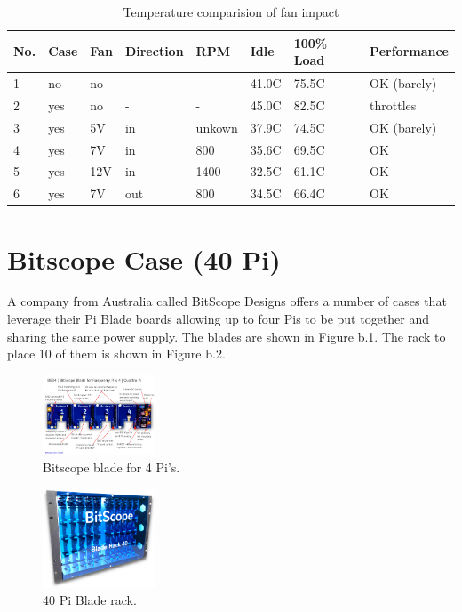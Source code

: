 \begin{table}[htb]
\caption{Temperature comparision of fan impact}\label{F:pi-fan}
\bigskip
\begin{center}
\begin{tabular}{llllllll}
\hline
No. & Case & Fan & Direction & RPM & Idle & 100\% Load &
Performance\tabularnewline
\hline
1 & no & no & - & - & 41.0C & 75.5C & OK (barely)\tabularnewline
2 & yes & no & - & - & 45.0C & 82.5C & throttles\tabularnewline
3 & yes & 5V & in & unkown & 37.9C & 74.5C & OK (barely)\tabularnewline
4 & yes & 7V & in & 800 & 35.6C & 69.5C & OK\tabularnewline
5 & yes & 12V & in & 1400 & 32.5C & 61.1C & OK\tabularnewline
6 & yes & 7V & out & 800 & 34.5C & 66.4C & OK\tabularnewline
\hline
\end{tabular}
\end{center}
\end{table}




\section{Bitscope Case (40 Pi)}\label{bitscope-case-40-pi}

A company from Australia called BitScope Designs offers a number of
cases that leverage their Pi Blade boards allowing up to four Pis to be
put together and sharing the same power supply. The blades are shown in
Figure b.1. The rack to place 10 of them is shown in Figure b.2.

\begin{figure}
\centering
\includegraphics[width=0.3\textwidth]{images/04.jpg}
\caption{Bitscope blade for 4 Pi's.}
\end{figure}


\begin{figure}
\centering
\includegraphics[width=0.3\textwidth]{images/br40a.png}
\caption{40 Pi Blade rack.}
\end{figure}


